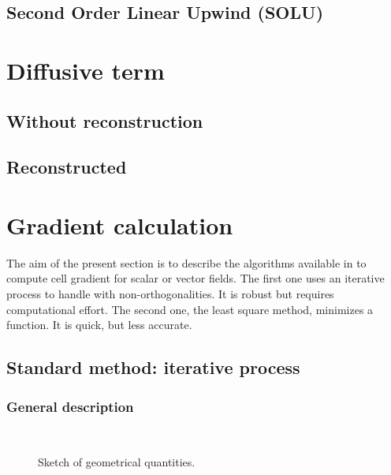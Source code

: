\subsection{Second Order Linear Upwind (SOLU)}


\section{Diffusive term}

\subsection{Without reconstruction}

\subsection{Reconstructed}



\section{Gradient calculation}

The aim of the present section is to describe the algorithms available in \CS 
to compute cell gradient for scalar or vector fields. The first one uses an 
iterative process to handle with non-orthogonalities. It is robust but requires 
computational effort. The second one, the least square method, minimizes a 
function. It is quick, but less accurate.

\subsection{Standard method: iterative process}\label{sec:space_discretization_it_grad}


\subsubsection{General description}
\begin{figure}[!htbcp]
\centering
\mbox{
 \,
}
\caption{\label{fig:geom_gradrc}
Sketch of geometrical quantities.
}
\end{figure}

